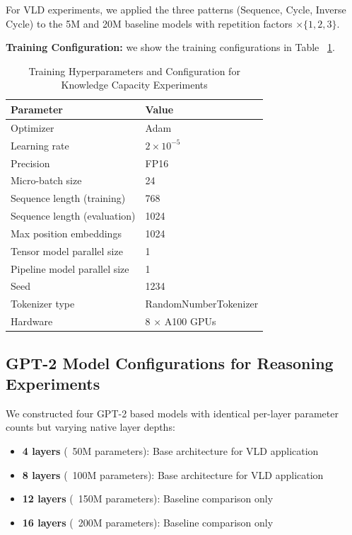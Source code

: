 \documentclass{article} %
\begin{document}
For VLD experiments, we applied the three patterns (Sequence, Cycle, Inverse Cycle) to the 5M and 20M baseline models with repetition factors $\times\{1,2,3\}$.

\textbf{Training Configuration:} we show the training configurations in Table ~\ref{tab:e1}.
\begin{table}[h]
\centering
\caption{Training Hyperparameters and Configuration for Knowledge Capacity Experiments}
\begin{tabular}{ll}
\toprule
\textbf{Parameter} & \textbf{Value} \\
\midrule
Optimizer & Adam \\
Learning rate & $2 \times 10^{-5}$ \\
Precision & FP16 \\
Micro-batch size & 24 \\
Sequence length (training) & 768 \\
Sequence length (evaluation) & 1024 \\
Max position embeddings & 1024 \\
Tensor model parallel size & 1 \\
Pipeline model parallel size & 1 \\
Seed & 1234 \\
Tokenizer type & RandomNumberTokenizer \\
Hardware & 8 × A100 GPUs \\
\bottomrule
\end{tabular}
\label{tab:e1}
\end{table}

\subsection{GPT-2 Model Configurations for Reasoning Experiments} \label{subsec:gpt2_reasoning}

We constructed four GPT-2 based models with identical per-layer parameter counts but varying native layer depths:

\begin{itemize}
    \item \textbf{4 layers} (~50M parameters): Base architecture for VLD application
    \item \textbf{8 layers} (~100M parameters): Base architecture for VLD application  
    \item \textbf{12 layers} (~150M parameters): Baseline comparison only
    \item \textbf{16 layers} (~200M parameters): Baseline comparison only
\end{itemize}
\end{document}
